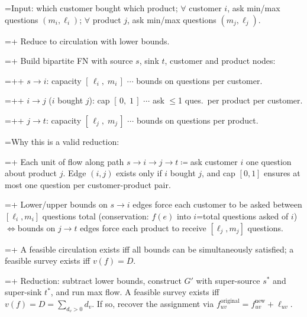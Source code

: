 \documentclass[8pt,letterpaper,twocolumn]{extarticle}
\newlength{\tphang}   \setlength{\tphang}{0.10in}
\newlength{\blistind} \setlength{\blistind}{0.05in}
\newlength{\bmark}    \setlength{\bmark}{0.8em}
\newcommand{\mysec}[1]{%
  \vspace{\dimexpr5pt-\parskip\relax}%
  \noindent\underline{\smash[b]{#1}}%
  \par\nobreak\ignorespaces}
\newcommand{\tp}[1]{%
  \hangindent=\tphang\hangafter=1\noindent#1\par}
\newcommand{\kp}[1]{%
  \hangindent=\dimexpr\blistind+\bmark\relax\hangafter=1%
  \noindent\hspace*{\blistind}%
  \makebox[\bmark][l]{\raisebox{0.45ex}{\tiny$\circ$}}#1\par}
\newcommand{\fp}[1]{%
  \hangindent=\dimexpr\blistind+\bmark+\bmark\relax\hangafter=1%
  \noindent\hspace*{\dimexpr\blistind+\bmark\relax}%
  \makebox[\bmark][l]{\raisebox{0.45ex}{\tiny$\bullet$}}#1\par}
\newcommand{\ap}[1]{%
  \hangindent=\dimexpr\blistind+\bmark\relax\hangafter=1%
  \noindent\hspace*{\blistind}%
  \makebox[\bmark][l]{\raisebox{0.3ex}{\footnotesize$\Rightarrow$}}#1\par}
\begin{document}
\mysec{Survey Design Problem}
\tp{Input: which customer bought which product; $\forall$ customer $i$, ask min/max questions $(m_i,\ell_i)$; $\forall$ product $j$, ask min/max questions $(m_j,\ell_j)$.}
\ap{Reduce to circulation with lower bounds.}
\kp{Build bipartite FN with source $s$, sink $t$, customer and product nodes:}
\fp{$s{\to}i$: capacity $[\,\ell_i,\;m_i\,]$ {$\cdots$} bounds on questions per customer.}
\fp{$i{\to}j$ ($i$ bought $j$): cap $[\,0,\;1\,]$ {$\cdots$} ask {$\le$}1 ques.\ per product per customer.}
\fp{$j{\to}t$: capacity $[\,\ell_j,\;m_j\,]$ {$\cdots$} bounds on questions per product.}
\begin{center}
\end{center}
\tp{Why this is a valid reduction:}
\kp{Each unit of flow along path $s{\to}i{\to}j{\to}t${$\coloneq$}ask customer $i$ one question about product $j$. Edge $(i,j)$ exists only if $i$ bought $j$, and cap $[0,1]$ ensures at most one question per customer-product pair.}
\kp{Lower/upper bounds on $s{\to}i$ edges force each customer to be asked between $[\ell_i,m_i]$ questions total (conservation: $f(e)$ into $i${=}total questions asked of $i$){$\Leftrightarrow $}bounds on $j{\to}t$ edges force each product to receive $[\ell_j,m_j]$ questions.}
\kp{A feasible circulation exists iff all bounds can be simultaneously satisfied; a feasible survey exists iff $v(f){=}D$.}
\kp{Reduction: subtract lower bounds, construct $G'$ with super-source $s^*$ and super-sink $t^*$, and run max flow. A feasible survey exists iff $v(f){=}D{=}\sum_{d_v>0}d_v$. If so, recover the assignment via $f_{uv}^{\text{original}}{=}f_{uv}^{\text{new}}{+}\ell_{uv}$.}
\end{document}
